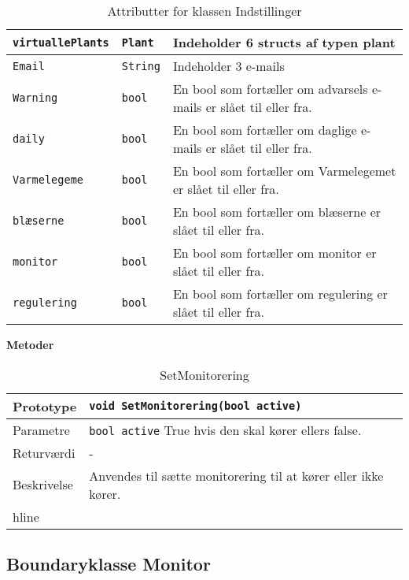 \begin{table}[h]
\begin{tabularx}{\textwidth}{| >{\raggedright\arraybackslash}X | >{\raggedright\arraybackslash}X | >{\raggedright\arraybackslash}p{10 cm} |} \hline
\texttt{virtuallePlants} & \texttt{Plant} & Indeholder 6 structs af typen plant \\\hline
\texttt{Email} & \texttt{String} & Indeholder 3 e-mails \\\hline
\texttt{Warning} & \texttt{bool} & En bool som fortæller om advarsels e-mails er slået til eller fra.\\\hline
\texttt{daily} & \texttt{bool} & En bool som fortæller om daglige e-mails er slået til eller fra. \\\hline
\texttt{Varmelegeme} & \texttt{bool} & En bool som fortæller om Varmelegemet er slået til eller fra.\\\hline
\texttt{blæserne} & \texttt{bool} & En bool som fortæller om blæserne er slået til eller fra. \\\hline
\texttt{monitor} & \texttt{bool} & En bool som fortæller om monitor er slået til eller fra. \\\hline
\texttt{regulering} & \texttt{bool} & En bool som fortæller om regulering er slået til eller fra. \\\hline
\end{tabularx}
\caption{Attributter for klassen Indstillinger}
\label{table:Indstillinger_attributter}
\end{table}

\textbf{Metoder}

\begin{table}[h]
\begin{tabularx}{\textwidth}{| >{\raggedright\arraybackslash}p{2.5 cm} | >{\raggedright\arraybackslash}X |} \hline
Prototype & \texttt{void SetMonitorering(bool active)} \\\hline
Parametre & \texttt{bool active} \newline
True hvis den skal kører ellers false. \\\hline
Returværdi & - \\\hline
Beskrivelse & Anvendes til sætte monitorering til at kører eller ikke kører. \\hline
\end{tabularx}
\caption{SetMonitorering}
\label{table:SetMonitorering}
\end{table}

\clearpage

\subsection{Boundaryklasse Monitor}

